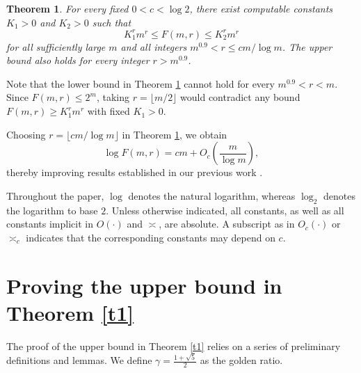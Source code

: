 \documentclass{article}
\newtheorem{theorem}{Theorem}
\theoremstyle{definition}
\begin{document}
\begin{theorem}\label{t2}
For every fixed $0<c<\log 2$, there exist computable constants $K_1>0$  and $K_2>0$ such that
$$
 K_1^r m^r\le F(m, r)\le K_2^r m^r
$$
for all sufficiently large $m$ and all integers
$m^{0.9}<r\le cm/\log m$.
The upper bound also holds for every integer $r>m^{0.9}$.
\end{theorem}

Note that the lower bound in Theorem \ref{t2} cannot hold for every $m^{0.9}<r<m$. Since $F(m,r)\leq 2^m$, taking $r=\lfloor m/2\rfloor$ would contradict any bound $F(m,r)\geq K_1^rm^r$ with fixed $K_1>0$.

Choosing $r=\lfloor cm/\log m\rfloor $ in Theorem \ref{t2}, we obtain
$$
\log F\left(m, r \right) =cm + O_c\left(\frac m{\log m}\right),
$$
thereby improving results established in our previous work \cite{DKN}.

Throughout the paper, $\log$ denotes the natural logarithm, whereas
$\log_2$ denotes the logarithm to base $2$.
Unless otherwise indicated, all constants, as well as all constants implicit
in $O(\cdot)$ and $\asymp$, are absolute.  A subscript as in
$O_c(\cdot)$ or $\asymp_c$ indicates that the corresponding constants may
depend on $c$.








\section{Proving the upper bound in Theorem \ref{t1}}

The proof of the upper bound in Theorem \ref{t1} relies on a series of preliminary definitions and lemmas. We define $\gamma=\frac{1+\sqrt{5}}{2}$
as the golden ratio.
\end{document}

